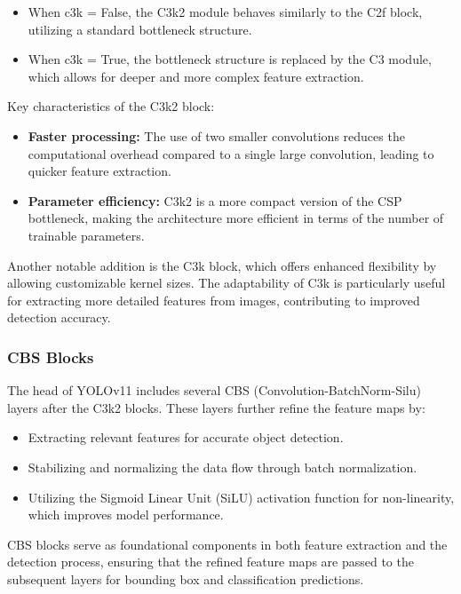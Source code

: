 \documentclass{article}
\begin{document}
\begin{itemize}
    \item When c3k = False, the C3k2 module behaves similarly to the C2f block, utilizing a standard bottleneck structure.
    \item When c3k = True, the bottleneck structure is replaced by the C3 module, which allows for deeper and more complex feature extraction.
\end{itemize}

Key characteristics of the C3k2 block:

\begin{itemize}
    \item \textbf{Faster processing: }The use of two smaller convolutions reduces the computational overhead compared to a single large convolution, leading to quicker feature extraction.
    \item \textbf{Parameter efficiency:} C3k2 is a more compact version of the CSP bottleneck, making the architecture more efficient in terms of the number of trainable parameters.
\end{itemize}

Another notable addition is the C3k block, which offers enhanced flexibility by allowing customizable kernel sizes. The adaptability of C3k is particularly useful for extracting more detailed features from images, contributing to improved detection accuracy.

\subsubsection{CBS Blocks}
The head of YOLOv11 includes several CBS (Convolution-BatchNorm-Silu) \cite{feng2024application} layers after the C3k2 blocks. These layers further refine the feature maps by:
\begin{itemize}
    \item Extracting relevant features for accurate object detection.
    \item Stabilizing and normalizing the data flow through batch normalization.
    \item Utilizing the  Sigmoid Linear Unit (SiLU) activation function for non-linearity, which improves model performance.
\end{itemize}

CBS blocks serve as foundational components in both feature extraction and the detection process, ensuring that the refined feature maps are passed to the subsequent layers for bounding box and classification predictions.
\end{document}

